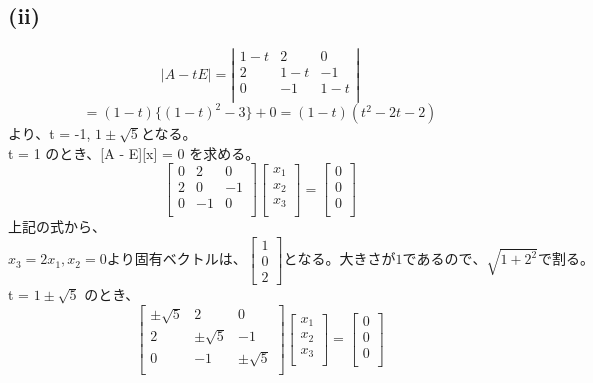 \documentclass[10pt]{jarticle}
\begin{document}
\subsection*{(ii)}
\[
|A - tE| = 
\left|
\begin{array}{ccc}
1 - t & 2 & 0 \\
2 & 1 - t & -1 \\
0 & -1 & 1 - t \\
\end{array}
\right|
\]
\[
 = 
(1 - t)\{(1 - t)^2 - 3\} + 0 = (1 - t)(t^2 - 2t - 2)
\]
より、t = -1, $1 \pm \sqrt{5}$となる。\\
t = 1 のとき、[A - E][x] = 0 を求める。\\
\[
\left[
\begin{array}{ccc}
0 & 2 & 0 \\
2 & 0 & -1 \\
0 & -1 & 0 \\
\end{array}
\right]
\left[
\begin{array}{c}
x_1 \\
x_2 \\
x_3 \\
\end{array}
\right]
 = 
\left[
\begin{array}{c}
0 \\
0 \\
0 \\
\end{array}
\right]
\]
上記の式から、
\[
x_3 = 2x_1, x_2 = 0 より 固有ベクトルは、
\left[
\begin{array}{c}
1 \\
0 \\
2
\end{array}
\right]
となる。大きさが 1 であるので、\sqrt{1 + 2^2} で割る。
\]
t = $1 \pm \sqrt{5}$ のとき、
\[
\left[
\begin{array}{ccc}
\pm \sqrt{5} & 2 & 0 \\
2 & \pm \sqrt{5} & -1 \\
0 & -1 & \pm \sqrt{5}\\
\end{array}
\right]
\left[
\begin{array}{c}
x_1 \\
x_2 \\
x_3 \\
\end{array}
\right]
 = 
\left[
\begin{array}{c}
0 \\
0 \\
0 \\
\end{array}
\right]
\]
\end{document}
